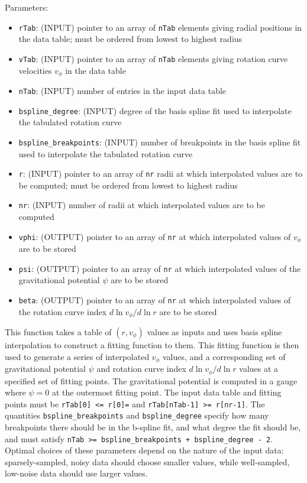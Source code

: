 \documentclass[12pt]{article}
\begin{document}
Parameters:
\begin{itemize}
\item \texttt{rTab}: (INPUT) pointer to an array of \verb=nTab= elements giving radial positions in the data table; must be ordered from lowest to highest radius
\item \texttt{vTab}: (INPUT) pointer to an array of \verb=nTab= elements giving rotation curve velocities $v_\phi$ in the data table
\item \texttt{nTab}: (INPUT) number of entries in the input data table
\item \verb=bspline_degree=: (INPUT) degree of the basis spline fit used to interpolate the tabulated rotation curve
\item \verb=bspline_breakpoints=: (INPUT) number of breakpoints in the basis spline fit used to interpolate the tabulated rotation curve
\item \texttt{r}: (INPUT) pointer to an array of \verb=nr= radii at which interpolated values are to be computed; must be ordered from lowest to highest radius
\item \texttt{nr}: (INPUT) number of radii at which interpolated values are to be computed
\item \texttt{vphi}: (OUTPUT) pointer to an array of \verb=nr= at which interpolated values of $v_\phi$ are to be stored
\item \texttt{psi}: (OUTPUT) pointer to an array of \verb=nr= at which interpolated values of the gravitational potential $\psi$ are to be stored
\item \texttt{beta}: (OUTPUT) pointer to an array of \verb=nr= at which interpolated values of the rotation curve index $d\ln v_\phi/d\ln r$ are to be stored
\end{itemize}

This function takes a table of $(r,v_\phi)$ values as inputs and uses basis spline interpolation to construct a fitting function to them. This fitting function is then used to generate a series of interpolated $v_\phi$ values, and a corresponding set of gravitational potential $\psi$ and rotation curve index $d\ln v_\phi/d\ln r$ values at a specified set of fitting points. The gravitational potential is computed in a gauge where $\psi=0$ at the outermost fitting point. The input data table and fitting points must be \verb!rTab[0] <= r[0]=! and \verb!rTab[nTab-1] >= r[nr-1]!. The quantities \texttt{bspline\_breakpoints} and \texttt{bspline\_degree} specify how many breakpoints there should be in the b-spline fit, and what degree the fit should be, and must satisfy \texttt{nTab >= bspline\_breakpoints + bspline\_degree - 2}. Optimal choices of these parameters depend on the nature of the input data: sparsely-sampled, noisy data should choose smaller values, while well-sampled, low-noise data should use larger values.
\end{document}
